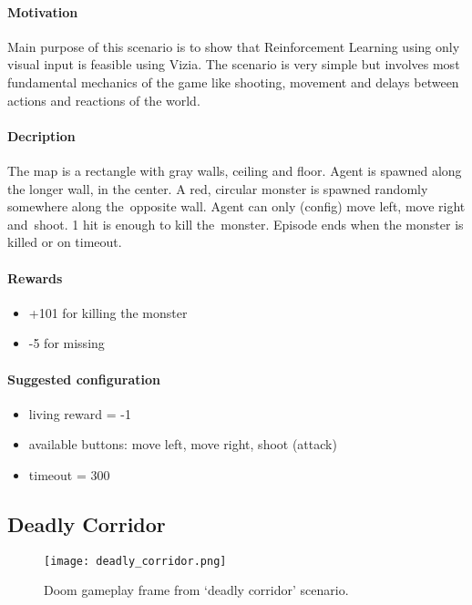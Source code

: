 		\paragraph{Motivation}
			Main purpose of this scenario is to show that Reinforcement Learning using only visual input is feasible using Vizia. The scenario is very simple but involves most fundamental mechanics of the game like shooting, movement and delays between actions and reactions of the world.
		
		\paragraph{Decription}
			The map is a rectangle with gray walls, ceiling and floor. Agent is spawned along the longer wall, in the center. A red, circular monster is spawned randomly somewhere along the~opposite wall. Agent can only (config) move left, move right and~shoot. 1 hit is enough to kill the~monster. Episode ends when the monster is killed or on timeout.
		
		\paragraph{Rewards}
			\begin{itemize}
				\item +101 for killing the monster
				\item -5 for missing
			\end{itemize}
		
		\paragraph{Suggested configuration}
			\begin{itemize}
				\item living reward = -1
				\item available buttons: move left, move right, shoot (attack)
				\item timeout = 300
			\end{itemize}
	\newpage

	\subsection{Deadly Corridor}
		\begin{figure}
			\centering
			\texttt{[image: deadly\_corridor.png]}
			\caption{Doom gameplay frame from `deadly corridor' scenario.}\label{fig:deadly_corridor}
		\end{figure}

